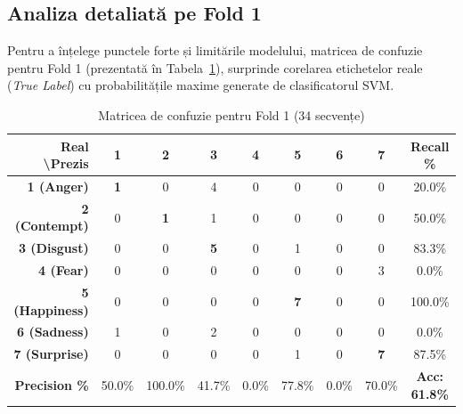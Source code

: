 \subsection*{Analiza detaliată pe Fold 1}
Pentru a înțelege punctele forte și limitările modelului, matricea de confuzie pentru Fold 1 (prezentată în Tabela~\ref{tab:confusion_matrix}), surprinde corelarea etichetelor reale (\textit{True Label}) cu probabilitățile maxime generate de clasificatorul SVM.

\begin{table}[h!]
	\centering
	\caption{Matricea de confuzie pentru Fold 1 (34 secvențe)}
	\label{tab:confusion_matrix}
	\begin{tabular}{r|ccccccc|c}
		\toprule
		\textbf{Real \textbackslash Prezis} & \textbf{1} & \textbf{2} & \textbf{3} & \textbf{4} & \textbf{5} & \textbf{6} & \textbf{7} & \textbf{Recall \%} \\ \midrule
		\textbf{1 (Anger)}     & \textbf{1} & 0 & 4 & 0 & 0 & 0 & 0 & 20.0\% \\
		\textbf{2 (Contempt)}  & 0 & \textbf{1} & 1 & 0 & 0 & 0 & 0 & 50.0\% \\
		\textbf{3 (Disgust)}   & 0 & 0 & \textbf{5} & 0 & 1 & 0 & 0 & 83.3\% \\
		\textbf{4 (Fear)}      & 0 & 0 & 0 & 0 & 0 & 0 & 3 & 0.0\% \\
		\textbf{5 (Happiness)} & 0 & 0 & 0 & 0 & \textbf{7} & 0 & 0 & 100.0\% \\
		\textbf{6 (Sadness)}   & 1 & 0 & 2 & 0 & 0 & 0 & 0 & 0.0\% \\
		\textbf{7 (Surprise)}  & 0 & 0 & 0 & 0 & 1 & 0 & \textbf{7} & 87.5\% \\ \midrule
		\textbf{Precision \%}  & 50.0\% & 100.0\% & 41.7\% & 0.0\% & 77.8\% & 0.0\% & 70.0\% & \textbf{Acc: 61.8\%} \\
		\bottomrule
	\end{tabular}
\end{table}


